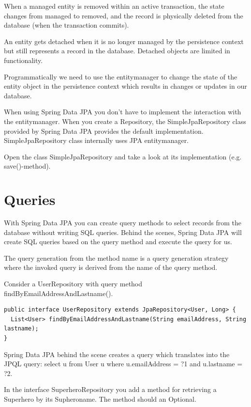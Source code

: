 When a managed entity is removed within an active transaction, the state changes from managed to removed, and the record is physically deleted from the database (when the transaction commits).

An entity gets detached when it is no longer managed by the persistence context but still represents a record in the database.
Detached objects are limited in functionality.

 
Programmatically we need to use the entitymanager to change the state of the entity object in the persistence context which results in changes or updates in our database. 

When using Spring Data JPA you don't have to implement the interaction with the entitymanager. When you create a Repository, the SimpleJpaRepository class provided by Spring Data JPA provides the default implementation. SimpleJpaRepository class internally uses JPA entitymanager.

\begin{oefening}
Open the class SimpleJpaRepository and take a look at its implementation (e.g. save()-method).
\end{oefening}


\section{Queries}

With Spring Data JPA you can create query methods to select records from the database without writing SQL queries. Behind the scenes, Spring Data JPA will create SQL queries based on the query method and execute the query for us.

The query generation from the method name is a query generation strategy where the invoked query is derived from the name of the query method.

Consider a UserRepository with query method findByEmailAddressAndLastname().

\begin{lstlisting}
public interface UserRepository extends JpaRepository<User, Long> {
  List<User> findByEmailAddressAndLastname(String emailAddress, String lastname);
}
\end{lstlisting}

Spring Data JPA behind the scene creates a query which translates into the JPQL query: select u from User u where u.emailAddress = ?1 and u.lastname = ?2. 

\begin{oefening}
In the interface SuperheroRepository you add a method for retrieving a Superhero by its Supheroname. The method should an Optional.
\end{oefening}


